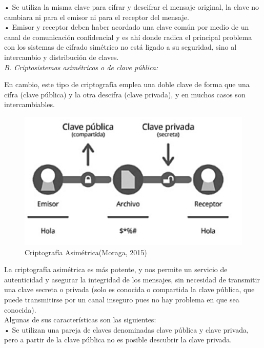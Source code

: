 \documentclass[9pt,24pt,twocolumn]{article}
\begin{document}
{• Se utiliza la misma clave para cifrar y descifrar el mensaje original, la clave no cambiara ni para el emisor ni para el receptor del mensaje.}
\\

{• Emisor y receptor deben haber acordado una clave común por medio de un canal de comunicación confidencial y es ahí donde radica el principal problema con los sistemas de cifrado simétrico no está ligado a su seguridad, sino al intercambio y distribución de claves.}
\\

\textit{B.  Criptosistemas asimétricos o de clave pública:}

{En cambio, este tipo de criptografía emplea una doble clave de forma que una cifra (clave pública) y la otra descifra (clave privada), y en muchos casos son intercambiables.}

\begin{figure}[h]
  \centering
    \includegraphics{asimetrico1}
  \caption{Criptografía Asimétrica(Moraga, 2015)}
  \label{fig:asim}
\end{figure}

{La criptografía asimétrica es más potente, y nos permite un servicio de autenticidad y asegurar la integridad de los mensajes, sin necesidad de transmitir una clave secreta o privada (solo es conocida o compartida la clave pública, que puede transmitirse por un canal inseguro pues no hay problema en que sea conocida).}
\\

{Algunas de sus características son las siguientes:}
\\

{• Se utilizan una pareja de claves denominadas clave pública y clave privada, pero a partir de la clave pública no es posible descubrir la clave privada.}
\\
\end{document}
